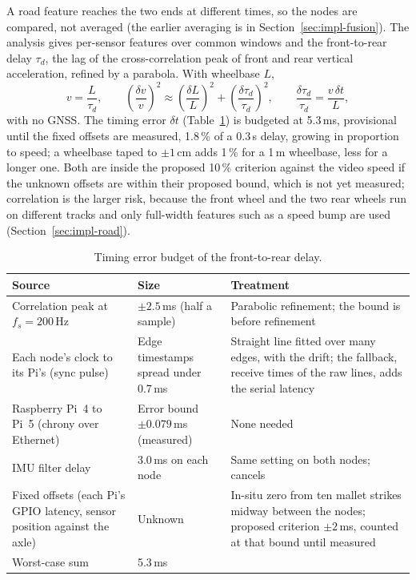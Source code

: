 A road feature reaches the two ends at different times, so the nodes are compared, not averaged (the earlier averaging is in Section~\ref{sec:impl-fusion}). The analysis gives per-sensor features over common windows and the front-to-rear delay $\tau_d$, the lag of the cross-correlation peak of front and rear vertical acceleration, refined by a parabola. With wheelbase $L$,
\begin{equation}
v = \frac{L}{\tau_d}, \qquad
\left(\frac{\delta v}{v}\right)^2 \approx \left(\frac{\delta L}{L}\right)^2 + \left(\frac{\delta \tau_d}{\tau_d}\right)^2, \qquad
\frac{\delta \tau_d}{\tau_d} = \frac{v\,\delta t}{L},
\label{eq:delay-speed}
\end{equation}
with no GNSS. The timing error $\delta t$ (Table~\ref{tab:delay-budget}) is budgeted at 5.3\,ms, provisional until the fixed offsets are measured, 1.8\,\% of a 0.3\,s delay, growing in proportion to speed; a wheelbase taped to $\pm 1$\,cm adds 1\,\% for a 1\,m wheelbase, less for a longer one. Both are inside the proposed 10\,\% criterion against the video speed if the unknown offsets are within their proposed bound, which is not yet measured; correlation is the larger risk, because the front wheel and the two rear wheels run on different tracks and only full-width features such as a speed bump are used (Section~\ref{sec:impl-road}).

\begin{table}[htbp]
\centering
\small
\caption[Timing error budget of the front-to-rear delay]{Timing error budget of the front-to-rear delay.}
\label{tab:delay-budget}
\begin{tabular}{|p{4.6cm}|p{3.4cm}|p{6.0cm}|}
\hline
\textbf{Source} & \textbf{Size} & \textbf{Treatment} \\ \hline
Correlation peak at $f_s = 200$\,Hz & $\pm 2.5$\,ms (half a sample) & Parabolic refinement; the bound is before refinement \\ \hline
Each node's clock to its Pi's (sync pulse) & Edge timestamps spread under 0.7\,ms & Straight line fitted over many edges, with the drift; the fallback, receive times of the raw lines, adds the serial latency \\ \hline
Raspberry Pi~4 to Pi~5 (chrony over Ethernet) & Error bound $\pm 0.079$\,ms (measured) & None needed \\ \hline
IMU filter delay & 3.0\,ms on each node & Same setting on both nodes; cancels \\ \hline
Fixed offsets (each Pi's GPIO latency, sensor position against the axle) & Unknown & In-situ zero from ten mallet strikes midway between the nodes; proposed criterion $\pm 2$\,ms, counted at that bound until measured \\ \hline
Worst-case sum & 5.3\,ms & \\ \hline
\end{tabular}
\end{table}

